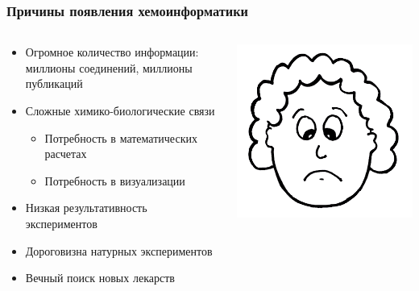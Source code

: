 \begin{frame}
  \frametitle{Причины появления хемоинформатики}
  \begin{columns}
    \begin{column}{0.5\textwidth}
  \begin{itemize}
    \item Огромное количество информации: миллионы соединений, миллионы публикаций
    \item Сложные химико-биологические связи
      \begin{itemize}
        \item Потребность в математических расчетах
        \item Потребность в визуализации
      \end{itemize}
    \item Низкая результативность экспериментов
    \item Дороговизна натурных экспериментов
    \item Вечный поиск новых лекарств
  \end{itemize}
   \end{column}
   \begin{column}{0.5\textwidth}
     \centering \includegraphics[scale=0.2]{images/sad.png} \\ 

\end{column}
\end{columns}
\end{frame}
